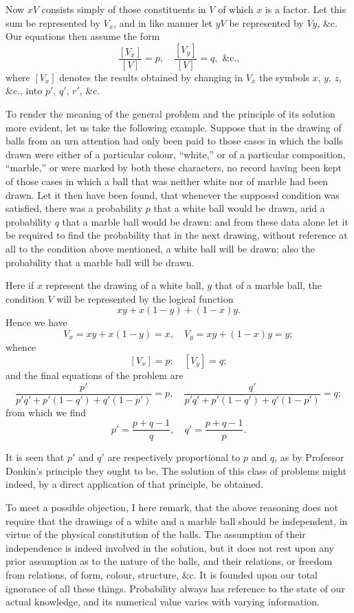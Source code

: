 \documentclass[oneside]{book}
\begin{document}
Now $x V$ consists simply of those constituents in $V$ of which
$x$ is a factor. Let this sum be represented by $V_x$, and in like
manner let $yV$ be represented by $Vy$, \&c. Our equations then
assume the form
\[
  \frac{\left[ V_x \right]}{\left[ V \right]} = p,\quad
  \frac{\left[ V_y \right]}{\left[ V \right]} = q,\text{ \&c.,}
\]
where $\left[ V_x \right]$ denotes the results obtained by changing in $V_x$ the
symbols $x$, $y$, $z$, \&c., into $p'$, $q'$, $r'$, \&c.

To render the meaning of the general problem and the
principle of its solution more evident, let us take the following example.
Suppose that in the drawing of balls from an urn
attention had only been paid to those cases in which the balls
drawn were either of a particular colour, ``white,'' or of a particular
composition, ``marble,'' or were marked by both these
characters, no record having been kept of those cases in which a
ball that was neither white nor of marble had been drawn. Let
it then have been found, that whenever the supposed condition
was satisfied, there was a probability $p$ that a white ball would be
drawn, arid a probability $q$ that a marble ball would be drawn: and
from these data alone let it be required to find the probability
that in the next drawing, without reference at all to the condition
above mentioned, a white ball will be drawn; also the probability
that a marble ball will be drawn.

Here if $x$ represent the drawing of a white ball, $y$ that of a
marble ball, the condition $V$ will be represented by the logical
function
\[
  xy + x(1-y) + (1-x)y.
\]
Hence we have
\[
  V_x = xy + x(1-y) = x,\quad  V_y = xy + (1-x)y = y;
\]
whence
\[
  [V_x] = p;\quad [V_y] = q;
\]
and the final equations of the problem are
\[
  \frac{p'}{p'q' + p'(1-q') + q'(1-p')} = p, \quad
  \frac{q'}{p'q' + p'(1-q') + q'(1-p')} = q;
\]
from which we find
\[
  p' = \frac{p + q - 1}{q}, \quad
  q' = \frac{p + q - 1}{p}.
\]

It is seen that $p'$ and $q'$ are respectively proportional to $p$ and
$q$, as by Professor Donkin's principle they ought to be. The
solution of this class of problems might indeed, by a direct application
of that principle, be obtained.

To meet a possible objection, I here remark, that the above
reasoning does not require that the drawings of a white and a
marble ball should be independent, in virtue of the physical constitution
of the balls. The assumption of their independence is
indeed involved in the solution, but it does not rest upon any
prior assumption as to the nature of the balls, and their relations,
or freedom from relations, of form, colour, structure, \&c. It is
founded upon our total ignorance of all these things. Probability
always has reference to the state of our actual knowledge,
and its numerical value varies with varying information.
\end{document}
